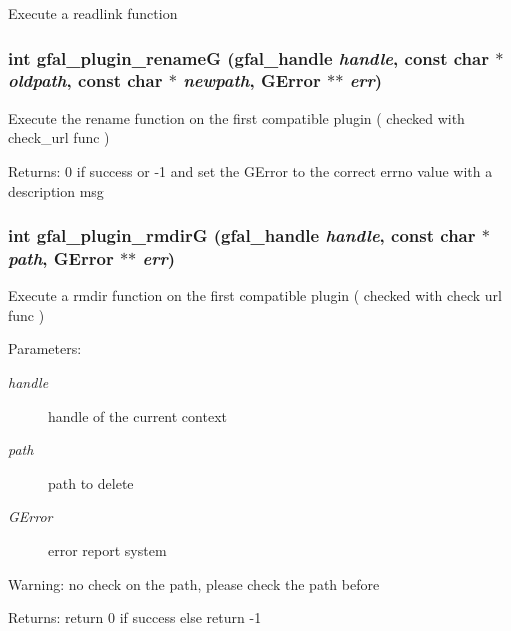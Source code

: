 Execute a readlink function 
\subsubsection{\setlength{\rightskip}{0pt plus 5cm}int gfal\_\-plugin\_\-rename\-G (gfal\_\-handle {\em handle}, const char $\ast$ {\em oldpath}, const char $\ast$ {\em newpath}, GError $\ast$$\ast$ {\em err})}\label{gfal__common__plugin_8h_ee26850796f50439ded98dafc7cd064b}


Execute the rename function on the first compatible plugin ( checked with check\_\-url func ) \begin{Desc}
\item[Returns:]0 if success or -1 and set the GError to the correct errno value with a description msg \end{Desc}
\subsubsection{\setlength{\rightskip}{0pt plus 5cm}int gfal\_\-plugin\_\-rmdir\-G (gfal\_\-handle {\em handle}, const char $\ast$ {\em path}, GError $\ast$$\ast$ {\em err})}\label{gfal__common__plugin_8h_d3bcfafdf8d90935cb312388cdd6bb92}


Execute a rmdir function on the first compatible plugin ( checked with check url func ) \begin{Desc}
\item[Parameters:]
\begin{description}
\item[{\em handle}]handle of the current context \item[{\em path}]path to delete \item[{\em GError}]error report system \end{description}
\end{Desc}
\begin{Desc}
\item[Warning:]no check on the path, please check the path before \end{Desc}
\begin{Desc}
\item[Returns:]return 0 if success else return -1 \end{Desc}
